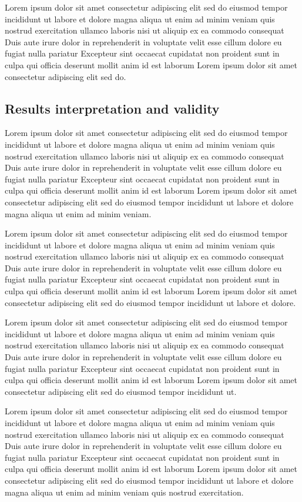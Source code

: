 Lorem ipsum dolor sit amet consectetur adipiscing elit sed do eiusmod tempor incididunt ut labore et dolore magna aliqua ut enim ad minim veniam quis nostrud exercitation ullamco laboris nisi ut aliquip ex ea commodo consequat Duis aute irure dolor in reprehenderit in voluptate velit esse cillum dolore eu fugiat nulla pariatur Excepteur sint occaecat cupidatat non proident sunt in culpa qui officia deserunt mollit anim id est laborum Lorem ipsum dolor sit amet consectetur adipiscing elit sed do.

\subsection{Results interpretation and validity}
Lorem ipsum dolor sit amet consectetur adipiscing elit sed do eiusmod tempor incididunt ut labore et dolore magna aliqua ut enim ad minim veniam quis nostrud exercitation ullamco laboris nisi ut aliquip ex ea commodo consequat Duis aute irure dolor in reprehenderit in voluptate velit esse cillum dolore eu fugiat nulla pariatur Excepteur sint occaecat cupidatat non proident sunt in culpa qui officia deserunt mollit anim id est laborum Lorem ipsum dolor sit amet consectetur adipiscing elit sed do eiusmod tempor incididunt ut labore et dolore magna aliqua ut enim ad minim veniam.

Lorem ipsum dolor sit amet consectetur adipiscing elit sed do eiusmod tempor incididunt ut labore et dolore magna aliqua ut enim ad minim veniam quis nostrud exercitation ullamco laboris nisi ut aliquip ex ea commodo consequat Duis aute irure dolor in reprehenderit in voluptate velit esse cillum dolore eu fugiat nulla pariatur Excepteur sint occaecat cupidatat non proident sunt in culpa qui officia deserunt mollit anim id est laborum Lorem ipsum dolor sit amet consectetur adipiscing elit sed do eiusmod tempor incididunt ut labore et dolore.

Lorem ipsum dolor sit amet consectetur adipiscing elit sed do eiusmod tempor incididunt ut labore et dolore magna aliqua ut enim ad minim veniam quis nostrud exercitation ullamco laboris nisi ut aliquip ex ea commodo consequat Duis aute irure dolor in reprehenderit in voluptate velit esse cillum dolore eu fugiat nulla pariatur Excepteur sint occaecat cupidatat non proident sunt in culpa qui officia deserunt mollit anim id est laborum Lorem ipsum dolor sit amet consectetur adipiscing elit sed do eiusmod tempor incididunt ut.

Lorem ipsum dolor sit amet consectetur adipiscing elit sed do eiusmod tempor incididunt ut labore et dolore magna aliqua ut enim ad minim veniam quis nostrud exercitation ullamco laboris nisi ut aliquip ex ea commodo consequat Duis aute irure dolor in reprehenderit in voluptate velit esse cillum dolore eu fugiat nulla pariatur Excepteur sint occaecat cupidatat non proident sunt in culpa qui officia deserunt mollit anim id est laborum Lorem ipsum dolor sit amet consectetur adipiscing elit sed do eiusmod tempor incididunt ut labore et dolore magna aliqua ut enim ad minim veniam quis nostrud exercitation.

